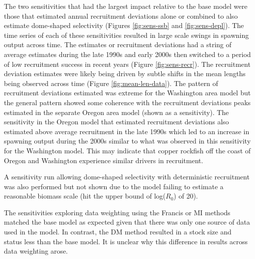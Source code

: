 \documentclass[11pt,
  english,
  a4paper,
]{article}
\begin{document}
The two sensitivities that had the largest impact relative to the base model were those that estimated annual recruitment deviations alone or combined to also estimate dome-shaped selectivity (Figures \ref{fig:sens-ssb} and \ref{fig:sens-depl}). The time series of each of these sensitivities resulted in large scale swings in spawning output across time. The estimates or recruitment deviations had a string of average estimates during the late 1990s and early 2000s then switched to a period of low recruitment success in recent years (Figure \ref{fig:sens-recr}). The recruitment deviation estimates were likely being driven by subtle shifts in the mean lengths being observed across time (Figure \ref{fig:mean-len-data}). The pattern of recruitment deviations estimated was extreme for the Washington area model but the general pattern showed some coherence with the recruitment deviations peaks estimated in the separate Oregon area model (shown as a sensitivity). The sensitivity in the Oregon model that estimated recruitment deviations also estimated above average recruitment in the late 1990s which led to an increase in spawning output during the 2000s similar to what was observed in this sensitivity for the Washington model. This may indicate that copper rockfish off the coast of Oregon and Washington experience similar drivers in recruitment.

\leavevmode\tagmcend\tagstructend\par


A sensitivity run allowing dome-shaped selectivity with deterministic recruitment was also performed but not shown due to the model failing to estimate a reasonable biomass scale (hit the upper bound of log({\(R_0\)\leavevmode\tagmcend\tagstructend}) of 20).

\leavevmode\tagmcend\tagstructend\par


The sensitivities exploring data weighting using the Francis or MI methods matched the base model as expected given that there was only one source of data used in the model. In contrast, the DM method resulted in a stock size and status less than the base model. It is unclear why this difference in results across data weighting arose.

\leavevmode\tagmcend\tagstructend\par
\end{document}
